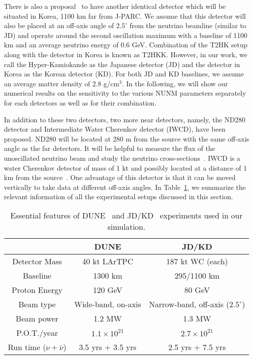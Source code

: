 \documentclass[11pt,a4paper]{article}
\newcommand{\capdef}{}
\newcommand{\mycaption}[2][\capdef]{\renewcommand{\capdef}{#2}
	\caption[#1]{{\footnotesize #2}}}
\begin{document}
There is also a proposal~\cite{Seo:2019dpr} to have another identical detector which will be situated in Korea, 1100 km far from J-PARC. We assume that this detector will also be placed at an off-axis angle of $2.5^{\circ}$ from the neutrino beamline (similar to JD) and operate around the second oscillation maximum with a baseline of 1100 km and an average neutrino energy of 0.6 GeV. Combination of the T2HK setup along with the detector in Korea is known as T2HKK. However, in our work, we call the Hyper-Kamiokande as the Japanese detector (JD) and the detector in Korea as the Korean detector (KD). For both JD and KD baselines, we assume an average matter density of 2.8 g/cm$^3$.
 In the following, we will show our numerical results on the sensitivity to the various NUNM parameters separately for each detectors as well as for their combination.


In addition to these two detectors, two more near detectors, namely, the ND280 detector and Intermediate Water Cherenkov detector (IWCD), have been proposed. ND280 will be located at 280 m from the source with the same off-axis angle as the far detectors. It will be helpful to measure the flux of the unoscillated neutrino beam and study the neutrino cross-sections~\cite{T2K:2019bbb}. IWCD is a water Cherenkov detector of mass of 1 kt and possibly located at a distance of 1 km from the source~\cite{Drakopoulou:2017qdu, Wilson:2020trq}. One advantage of this detector is that it can be moved vertically to take data at different off-axis angles.  
In Table~\ref{tab:exp_details}, we summarize the relevant information of all the experimental setups discussed in this section.


\begin{table}
\centering
\begin{tabular}{|c|c|c|}
\hline \hline
 & DUNE & JD/KD\\ 
\hline
Detector Mass& 40 kt LArTPC & 187 kt WC (each)  \\
\hline
Baseline & 1300 km & 295/1100 km \\
\hline
Proton Energy & 120 GeV & 80 GeV \\
\hline
Beam type & Wide-band, on-axis & Narrow-band, off-axis ($2.5^{\circ}$)\\
\hline
Beam power & 1.2 MW & 1.3 MW \\
\hline
P.O.T./year& $1.1\times10^{21}$ & $2.7\times10^{21}$\\ 
\hline
Run time ($\nu+\bar{\nu}$) & 3.5 yrs + 3.5 yrs & 2.5 yrs + 7.5 yrs  \\
\hline\hline
\end{tabular}
\mycaption{Essential features of DUNE~\cite{DUNE:2021cuw} and JD/KD~\cite{Hyper-Kamiokande:2016srs}  experiments used in our simulation.}
 \label{tab:exp_details}
\end{table}
 
\end{document}
